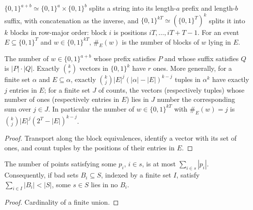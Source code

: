 \begin{definition}
  \label{def:encodings-blocks}
  \leanok
  $\{0,1\}^{a+b} \simeq \{0,1\}^a \times \{0,1\}^b$ splits a string into its
  length-$a$ prefix and length-$b$ suffix, with concatenation as the inverse,
  and $\{0,1\}^{kT} \simeq (\{0,1\}^T)^k$ splits it into $k$ blocks in
  row-major order: block $i$ is positions $iT, \dots, iT + T - 1$. For an
  event $E \subseteq \{0,1\}^T$ and $w \in \{0,1\}^{kT}$, $\#_E(w)$ is the
  number of blocks of $w$ lying in $E$.
\end{definition}

\begin{lemma}
  \label{lem:encodings-block-count}
  \leanok
  The number of $w \in \{0,1\}^{a+b}$ whose prefix satisfies $P$ and whose
  suffix satisfies $Q$ is $|P| \cdot |Q|$. Exactly $\binom{k}{r}$ vectors in
  $\{0,1\}^k$ have $r$ ones. More generally, for a finite set $\alpha$ and
  $E \subseteq \alpha$, exactly $\binom{k}{j} |E|^j (|\alpha| - |E|)^{k-j}$
  tuples in $\alpha^k$ have exactly $j$ entries in $E$; for a finite set $J$
  of counts, the vectors (respectively tuples) whose number of ones
  (respectively entries in $E$) lies in $J$ number the corresponding sum over
  $j \in J$. In particular the number of $w \in \{0,1\}^{kT}$ with
  $\#_E(w) = j$ is $\binom{k}{j} |E|^j (2^T - |E|)^{k-j}$.
\end{lemma}
\begin{proof}
  \leanok
  Transport along the block equivalences, identify a vector with its set of
  ones, and count tuples by the positions of their entries in $E$.
\end{proof}

\begin{lemma}
  \label{lem:encodings-union-count}
  \leanok
  The number of points satisfying some $p_i$, $i \in s$, is at most
  $\sum_{i \in s} |p_i|$. Consequently, if bad sets $B_i \subseteq S$,
  indexed by a finite set $I$, satisfy $\sum_{i \in I} |B_i| < |S|$, some
  $s \in S$ lies in no $B_i$.
\end{lemma}
\begin{proof}
  \leanok
  Cardinality of a finite union.
\end{proof}

